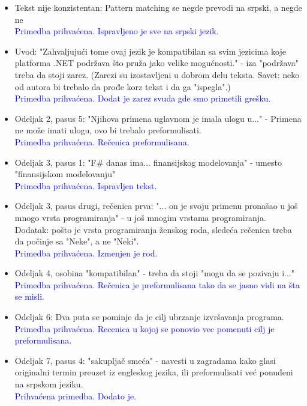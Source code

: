 \documentclass[a4paper]{report}
\newcommand{\odgovor}[1]{\textcolor{blue}{#1}}
\begin{document}
\begin{itemize}
    \item Tekst nije konzistentan: Pattern matching se negde prevodi na srpski, a negde ne
	\\ \odgovor{Primedba prihvaćena. Ispravljeno je sve na srpski jezik.}    
    \item Uvod: "Zahvaljujući tome ovaj jezik je kompatibilan sa svim jezicima koje platforma .NET podržava što pruža jako velike mogućnosti."  - iza "podržava" treba da stoji zarez. (Zarezi su izostavljeni u dobrom delu teksta. Savet: neko od autora bi trebalo da prođe korz tekst i da ga "ispegla".)    
	\\ \odgovor{Primedba prihvaćena. Dodat je zarez svuda gde smo primetili grešku.}    
    \item Odeljak 2, pasus 5: "Njihova primena uglavnom je imala ulogu u..." - Primena ne može imati ulogu, ovo bi trebalo preformulisati.
	\\ \odgovor{Primedba prihvaćena. Rečenica preformulisana.}    
    \item Odeljak 3, pasus 1: "F\# danas ima... finansijskog modelovanja" - umesto "finansijskom modelovanju"
	\\ \odgovor{Primedba prihvaćena. Ispravljen tekst.}    
    \item Odeljak 3, pasus drugi, rečenica prva: "... on je svoju primenu pronašao u još mnogo vrsta programiranja" - u još mnogim vrstama programiranja. Dodatak: pošto je vrsta programiranja ženskog roda, sledeća rečenica treba da počinje sa "Neke", a ne "Neki".
    \\ \odgovor{Primedba prihvaćena. Izmenjen je rod.}
    \item Odeljak 4, osobina "kompatibilan" - treba da stoji "mogu da se pozivaju i..."
	\\ \odgovor{Primedba prihvaćena. Rečenica je preformulisana tako da se jasno vidi na šta se misli.}    
    \item Odeljak 6: Dva puta se pominje da je cilj ubrzanje izvršavanja programa.
    \\ \odgovor{Primedba prihvaćena. Recenica u kojoj se ponovio vec pomenuti cilj je preformulisana.} 
    \item Odeljak 7, pasus 4: "sakupljač smeća" - navesti u zagradama kako glasi originalni termin preuzet iz engleskog jezika, ili preformulisati već ponuđeni na srpskom jeziku.
    \\ \odgovor{Prihvaćena primedba. Dodato je.} 
\end{itemize}
\end{document}
